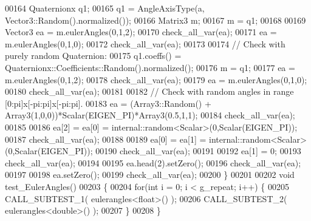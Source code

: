 \begin{DoxyCode}
00164   Quaternionx q1;
00165   q1 = AngleAxisType(a, Vector3::Random().normalized());
00166   Matrix3 m;
00167   m = q1;
00168   
00169   Vector3 ea = m.eulerAngles(0,1,2);
00170   check\_all\_var(ea);
00171   ea = m.eulerAngles(0,1,0);
00172   check\_all\_var(ea);
00173   
00174   \textcolor{comment}{// Check with purely random Quaternion:}
00175   q1.coeffs() = Quaternionx::Coefficients::Random().normalized();
00176   m = q1;
00177   ea = m.eulerAngles(0,1,2);
00178   check\_all\_var(ea);
00179   ea = m.eulerAngles(0,1,0);
00180   check\_all\_var(ea);
00181   
00182   \textcolor{comment}{// Check with random angles in range [0:pi]x[-pi:pi]x[-pi:pi].}
00183   ea = (Array3::Random() + Array3(1,0,0))*Scalar(EIGEN\_PI)*Array3(0.5,1,1);
00184   check\_all\_var(ea);
00185   
00186   ea[2] = ea[0] = internal::random<Scalar>(0,Scalar(EIGEN\_PI));
00187   check\_all\_var(ea);
00188   
00189   ea[0] = ea[1] = internal::random<Scalar>(0,Scalar(EIGEN\_PI));
00190   check\_all\_var(ea);
00191   
00192   ea[1] = 0;
00193   check\_all\_var(ea);
00194   
00195   ea.head(2).setZero();
00196   check\_all\_var(ea);
00197   
00198   ea.setZero();
00199   check\_all\_var(ea);
00200 \}
00201 
00202 \textcolor{keywordtype}{void} test\_EulerAngles()
00203 \{
00204   \textcolor{keywordflow}{for}(\textcolor{keywordtype}{int} i = 0; i < g\_repeat; i++) \{
00205     CALL\_SUBTEST\_1( eulerangles<float>() );
00206     CALL\_SUBTEST\_2( eulerangles<double>() );
00207   \}
00208 \}
\end{DoxyCode}
